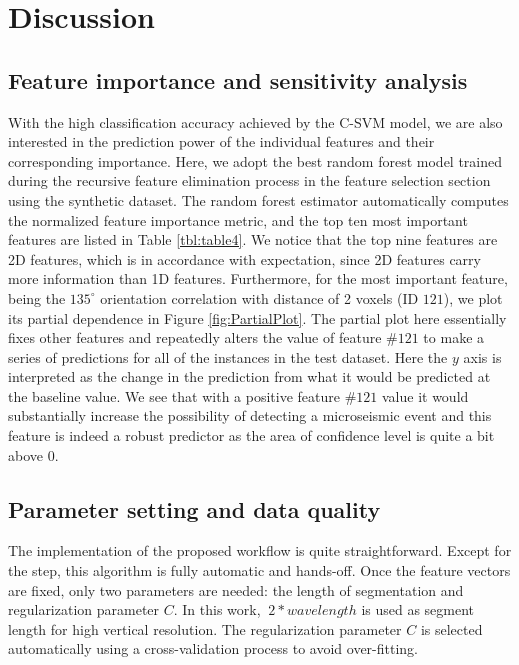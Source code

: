 \section{Discussion}
\subsection{Feature importance and sensitivity analysis}
With the high classification accuracy achieved by the C-SVM model, we are also interested in the prediction power of the individual features and their corresponding importance. Here, we adopt the best random forest model trained during the recursive feature elimination process in the feature selection section using the synthetic dataset. The random forest estimator automatically computes the normalized feature importance metric, and the top ten most important features are listed in Table \ref{tbl:table4}. We notice that the top nine features are 2D features, which is in accordance with expectation, since 2D features carry more information than 1D features. Furthermore, for the most important feature, being the $135^{\circ}$ orientation correlation with distance of 2  voxels (ID $121$), we plot its partial dependence in Figure \ref{fig:PartialPlot}. The partial plot here essentially fixes other features and repeatedly alters the value of feature $\#121$ to make a series of predictions for all of the instances in the test dataset. Here the $y$ axis is interpreted as the change in the prediction from what it would be predicted at the baseline value. We see that with a positive feature $\#121$ value it would substantially increase the possibility of detecting a microseismic event and this feature is indeed a robust predictor as the area of confidence level is quite a bit above 0.

\subsection{Parameter setting and data quality}
The implementation of the proposed workflow is quite straightforward. Except for the  step, this algorithm is fully automatic and hands-off. Once the feature vectors are fixed, only two parameters are needed: the length of segmentation and regularization parameter $C$. In this work, $~2*wavelength$ is used as  segment length for high vertical resolution. The regularization parameter $C$ is selected automatically using a cross-validation process to avoid over-fitting. 

